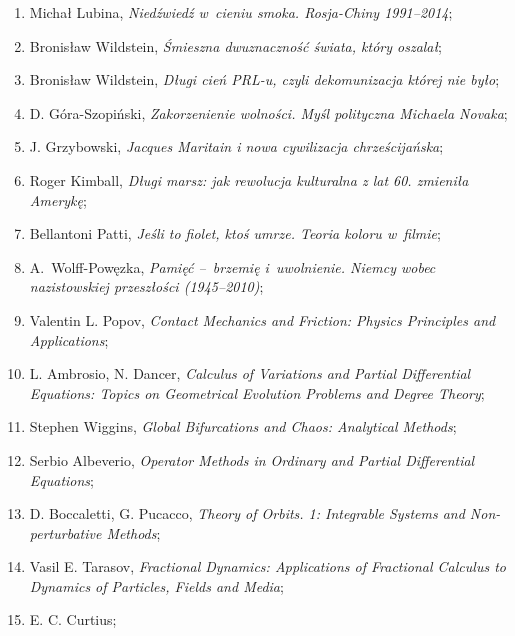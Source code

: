 \documentclass[a4paper,11pt]{article}
\begin{document}
\begin{enumerate}
\item Michał Lubina, \emph{Niedźwiedź w~cieniu smoka. Rosja-Chiny
    1991--2014};

\item Bronisław Wildstein, \emph{Śmieszna dwuznaczność świata, który
    oszalał};

\item Bronisław Wildstein, \emph{Długi cień PRL-u, czyli dekomunizacja
    której nie było};

\item D. Góra-Szopiński, \emph{Zakorzenienie wolności. Myśl polityczna
    Michaela Novaka};

\item J. Grzybowski, \emph{Jacques Maritain i nowa cywilizacja
    chrześcijańska};

\item Roger Kimball, \emph{Długi marsz: jak rewolucja kulturalna z lat
    60. zmieniła Amerykę};

\item Bellantoni Patti, \emph{Jeśli to fiolet, ktoś umrze. Teoria
    koloru w~filmie};

\item A.~Wolff-Powęzka, \emph{Pamięć --~brzemię i~uwolnienie. Niemcy
    wobec nazistowskiej przeszłości (1945--2010)};

\item Valentin L. Popov, \emph{Contact Mechanics and Friction: Physics
    Principles and Applications};

\item L. Ambrosio, N. Dancer, \emph{Calculus of Variations and Partial
    Differential Equations: Topics on Geometrical Evolution Problems
    and Degree Theory};

\item Stephen Wiggins, \emph{Global Bifurcations and Chaos: Analytical
    Methods};

\item Serbio Albeverio, \emph{Operator Methods in Ordinary and Partial
    Differential Equations};

\item D. Boccaletti, G. Pucacco, \emph{Theory of Orbits. 1: Integrable
    Systems and Non-perturbative Methods};

\item Vasil E. Tarasov, \emph{Fractional Dynamics: Applications of
    Fractional Calculus to Dynamics of Particles, Fields and Media};

\item E. C. Curtius;


\end{enumerate}
\end{document}
